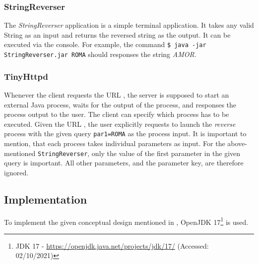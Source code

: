 \subsubsection{StringReverser}\label{subsubsec:01_part1_design_stringreverser}
The \textit{StringReverser} application is a simple terminal application. It takes any valid String as an input and returns the reversed string as the output. It can be executed via the console. For example, the command \texttt{\$ java -jar StringReverser.jar ROMA} should responses the string \textit{AMOR}.

\subsubsection{TinyHttpd}\label{subsubsec:01_part1_design_tinyhttpd}
Whenever the client requests the URL , the server is supposed to start an external Java process, waits for the output of the process, and responses the process output to the user.
The client can specify which process has to be executed. Given the URL , the user explicitly requests to launch the \textit{reverse} process with the given query \texttt{par1=ROMA} as the process input.
It is important to mention, that each process takes individual parameters as input. For the above-mentioned \texttt{StringReverser}, only the value of the first parameter in the given query is important. All other parameters, and the parameter key, are therefore ignored.


\newpage
\subsection{Implementation}\label{subsec:01_part1_impl}
To implement the given conceptual design mentioned in , OpenJDK 17\footnote{JDK 17 - \url{https://openjdk.java.net/projects/jdk/17/} (Accessed: 02/10/2021)} is used.

